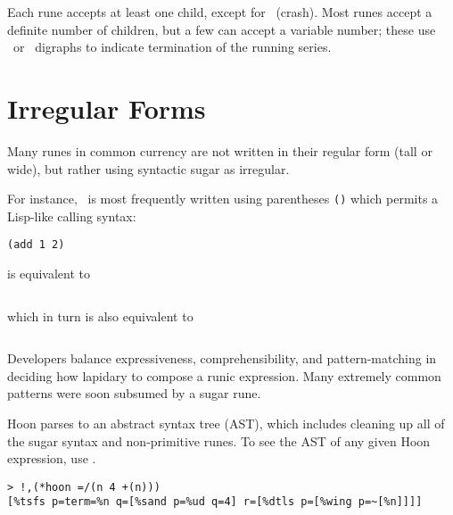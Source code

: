 Each rune accepts at least one child, except for \pzapzap~(crash).  Most runes accept a definite number of children, but a few can accept a variable number; these use \tistis~or \hephep~digraphs to indicate termination of the running series.

\section{Irregular Forms}

Many runes in common currency are not written in their regular form (tall or wide), but rather using syntactic sugar as irregular.

For instance, \pcenhep~is most frequently written using parentheses \texttt{()} which permits a Lisp-like calling syntax:

\begin{lstlisting}[language=hoon,
                   style=nonumbers]
(add 1 2)
\end{lstlisting}

is equivalent to

\begin{lstlisting}[language=hoon,
                   style=nonumbers]
%-  add  [1 2]
\end{lstlisting}

which in turn is also equivalent to

\begin{lstlisting}[language=hoon,
                   style=nonumbers]
%-(add [1 2])
\end{lstlisting}

Developers balance expressiveness, comprehensibility, and pattern-matching in deciding how lapidary to compose a runic expression.  Many extremely common patterns were soon subsumed by a sugar rune.

Hoon parses to an abstract syntax tree (AST), which includes cleaning up all of the sugar syntax and non-primitive runes.  To see the AST of any given Hoon expression, use \pzapcom.

\begin{lstlisting}[language=hoon,
                   style=nonumbers]
> !,(*hoon =/(n 4 +(n)))
[%tsfs p=term=%n q=[%sand p=%ud q=4] r=[%dtls p=[%wing p=~[%n]]]]
\end{lstlisting}


